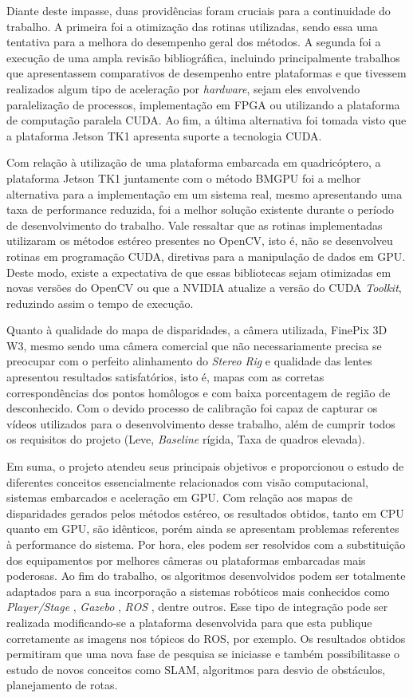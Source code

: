 Diante deste impasse, duas providências foram cruciais para a continuidade do trabalho. A primeira foi a otimização das rotinas utilizadas, sendo essa uma tentativa para a melhora do desempenho geral dos métodos. A segunda foi a execução de uma ampla revisão bibliográfica, incluindo principalmente trabalhos que apresentassem comparativos de desempenho entre plataformas e que tivessem realizados algum tipo de aceleração por \textit{hardware}, sejam eles envolvendo paralelização de processos, implementação em FPGA ou utilizando a plataforma de computação paralela CUDA. Ao fim, a última alternativa foi tomada visto que a plataforma Jetson TK1 apresenta suporte a tecnologia CUDA.

Com relação à utilização de uma plataforma embarcada em quadricóptero, a plataforma Jetson TK1 juntamente com o método BMGPU foi a melhor alternativa para a implementação em um sistema real, mesmo apresentando uma taxa de performance reduzida, foi a melhor solução existente durante o período de desenvolvimento do trabalho. Vale ressaltar que as rotinas implementadas utilizaram os métodos estéreo presentes no OpenCV, isto é, não se desenvolveu rotinas em programação CUDA, diretivas para a manipulação de dados em GPU. Deste modo, existe a expectativa de que essas bibliotecas sejam otimizadas em novas versões do OpenCV ou que a NVIDIA atualize a versão do CUDA \textit{Toolkit}, reduzindo assim o tempo de execução.

Quanto à qualidade do mapa de disparidades, a câmera utilizada, FinePix 3D W3, mesmo sendo uma câmera comercial que não necessariamente precisa se preocupar com o perfeito alinhamento do \textit{Stereo Rig} e qualidade das lentes apresentou resultados satisfatórios, isto é, mapas com as corretas correspondências dos pontos homôlogos e com baixa porcentagem de região de desconhecido. Com o devido processo de calibração foi capaz de capturar os vídeos utilizados para o desenvolvimento desse trabalho, além de cumprir todos os requisitos do projeto (Leve, \textit{Baseline} rígida, Taxa de quadros elevada).

Em suma, o projeto atendeu seus principais objetivos e proporcionou o estudo de diferentes conceitos essencialmente relacionados com visão computacional, sistemas embarcados e aceleração em GPU. Com relação aos mapas de disparidades gerados pelos métodos estéreo, os resultados obtidos, tanto em CPU quanto em GPU, são idênticos, porém ainda se apresentam problemas referentes à performance do sistema. Por hora, eles podem ser resolvidos com a substituição dos equipamentos por melhores câmeras ou plataformas embarcadas mais poderosas. Ao fim do trabalho, os algoritmos desenvolvidos podem ser totalmente adaptados para a sua incorporação a sistemas robóticos mais conhecidos como \textit{Player/Stage} \cite{Gerkey2010}, \textit{Gazebo} \cite{Gazebo}, \textit{ROS} \cite{ROS}, dentre outros. Esse tipo de integração pode ser realizada modificando-se a plataforma desenvolvida para que esta publique corretamente as imagens nos tópicos do ROS, por exemplo. Os resultados obtidos permitiram que uma nova fase de pesquisa se iniciasse e também possibilitasse o estudo de novos conceitos como SLAM, algoritmos para desvio de obstáculos, planejamento de rotas.

